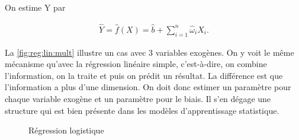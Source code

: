 On estime Y par

\begin{align*}
\hat{Y} = \hat{f} (X) = \hat{b}+\sum_{i=1}^n \hat{\omega}_{i} X_i.
\end{align*}

 La \autoref{fig:reg:lin:mult} illustre un cas avec 3 variables exogènes. On y voit le même mécanisme 
qu'avec la régression linéaire simple, c'est-à-dire, on combine l'information, on la traite et puis on prédit un résultat. La différence est que l'information a plus d'une dimension. On doit donc estimer un paramètre pour chaque variable exogène et un paramètre pour le biais. Il s'en dégage une structure qui est bien présente dans les modèles d'apprentissage statistique. 


\begin{figure}[h]
\centering
\caption{\label{fig:reg:log}Régression logistique}
\end{figure}
